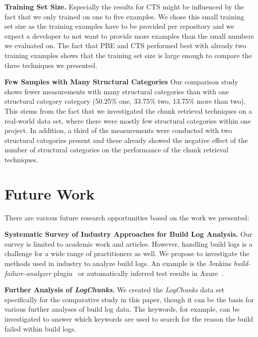 \textbf{Training Set Size.}
Especially the results for CTS might be influenced by the fact that we
only trained on one to five examples.
We chose this small training set
size as the training examples have to be provided per repository and
we expect a developer to not want to provide more examples than the
small numbers we evaluated on.
The fact that PBE and CTS performed best with already two training
examples shows that the training set size is large enough to
compare the three techniques we presented.

\textbf{Few Samples with Many Structural Categories}
Our comparison study shows fewer measurements with many structural
categories than with one structural category category
(50.25\% one, 33.75\% two, 13.75\% more than two).
This stems from the fact that we investigated the chunk retrieval
techniques on a real-world data set, where there were mostly few
structural categories within one project.
In addition, a third of the measurements were conducted with two
structural categories present and these already showed the negative
effect of the number of structural categories on the performance
of the chunk retrieval techniques.

\section{Future Work}

There are various future research opportunities based on the
work we presented:

\textbf{Systematic Survey of Industry Approaches for Build
Log Analysis.}
Our survey is limited to academic work and articles.
However, handling build logs is a challenge for a wide range of
practitioners as well.
We propose to investigate the methods used in industry to analyze
build logs.
An example is the Jenkins \emph{build-failure-analyzer}
plugin~\cite{jenkins2020failure-analyzer} or automatically
inferred test results in Azure~\cite{azure2020inferred}.

\textbf{Further Analysis of \emph{LogChunks}.}
We created the
\emph{LogChunks} data set \cite{brandt2020logchunks} specifically for
the comparative
study in this paper, though it can be the basis for various further
analyses of build log data.
The keywords, for example, can be
investigated to answer which keywords are used to search for the
reason the build failed within build logs.

